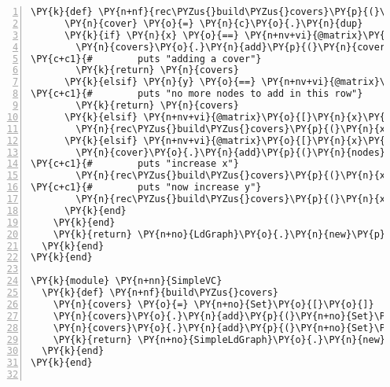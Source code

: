 \begin{Verbatim}[commandchars=\\\{\},numbers=left,firstnumber=1,stepnumber=1,xleftmargin=7mm, fontsize=\small]
    \PY{k}{def} \PY{n+nf}{rec\PYZus{}build\PYZus{}covers}\PY{p}{(}\PY{n}{x}\PY{p}{,}\PY{n}{y}\PY{p}{,}\PY{n}{c}\PY{p}{,}\PY{n}{covers}\PY{p}{,} \PY{n}{nodes}\PY{p}{)} 
      \PY{n}{cover} \PY{o}{=} \PY{n}{c}\PY{o}{.}\PY{n}{dup}
      \PY{k}{if} \PY{n}{x} \PY{o}{==} \PY{n+nv+vi}{@matrix}\PY{o}{.}\PY{n}{length}
        \PY{n}{covers}\PY{o}{.}\PY{n}{add}\PY{p}{(}\PY{n}{cover}\PY{p}{)}
\PY{c+c1}{#        puts "adding a cover"}
        \PY{k}{return} \PY{n}{covers}
      \PY{k}{elsif} \PY{n}{y} \PY{o}{==} \PY{n+nv+vi}{@matrix}\PY{o}{[}\PY{n}{x}\PY{o}{]}\PY{o}{.}\PY{n}{length}
\PY{c+c1}{#        puts "no more nodes to add in this row"}
        \PY{k}{return} \PY{n}{covers}
      \PY{k}{elsif} \PY{n+nv+vi}{@matrix}\PY{o}{[}\PY{n}{x}\PY{o}{]}\PY{o}{[}\PY{n}{y}\PY{o}{]} \PY{o}{==} \PY{l+m+mi}{0}
        \PY{n}{rec\PYZus{}build\PYZus{}covers}\PY{p}{(}\PY{n}{x}\PY{p}{,} \PY{n}{y}\PY{o}{+}\PY{l+m+mi}{1}\PY{p}{,} \PY{n}{cover}\PY{p}{,} \PY{n}{covers}\PY{p}{,} \PY{n}{nodes}\PY{p}{)}
      \PY{k}{elsif} \PY{n+nv+vi}{@matrix}\PY{o}{[}\PY{n}{x}\PY{o}{]}\PY{o}{[}\PY{n}{y}\PY{o}{]} \PY{o}{==} \PY{l+m+mi}{1}
        \PY{n}{cover}\PY{o}{.}\PY{n}{add}\PY{p}{(}\PY{n}{nodes}\PY{o}{[}\PY{n}{y}\PY{o}{]}\PY{o}{.}\PY{n}{id}\PY{p}{)}
\PY{c+c1}{#        puts "increase x"}
        \PY{n}{rec\PYZus{}build\PYZus{}covers}\PY{p}{(}\PY{n}{x}\PY{o}{+}\PY{l+m+mi}{1}\PY{p}{,} \PY{l+m+mi}{0}\PY{p}{,} \PY{n}{cover}\PY{p}{,} \PY{n}{covers}\PY{p}{,} \PY{n}{nodes}\PY{p}{)}
\PY{c+c1}{#        puts "now increase y"}
        \PY{n}{rec\PYZus{}build\PYZus{}covers}\PY{p}{(}\PY{n}{x}\PY{p}{,} \PY{n}{y}\PY{o}{+}\PY{l+m+mi}{1}\PY{p}{,} \PY{n}{c}\PY{p}{,} \PY{n}{covers}\PY{p}{,} \PY{n}{nodes}\PY{p}{)}
      \PY{k}{end}
    \PY{k}{end}
    \PY{k}{return} \PY{n+no}{LdGraph}\PY{o}{.}\PY{n}{new}\PY{p}{(}\PY{n}{rec\PYZus{}build\PYZus{}covers}\PY{p}{(}\PY{l+m+mi}{0}\PY{p}{,}\PY{l+m+mi}{0}\PY{p}{,} \PY{n+no}{Set}\PY{o}{[}\PY{o}{]}\PY{p}{,} \PY{n+no}{Set}\PY{o}{[}\PY{o}{]}\PY{p}{,} \PY{n}{nodes}\PY{p}{)}\PY{p}{,} \PY{n}{nodes}\PY{p}{)}
  \PY{k}{end}  
\PY{k}{end}

\PY{k}{module} \PY{n+nn}{SimpleVC}
  \PY{k}{def} \PY{n+nf}{build\PYZus{}covers}
    \PY{n}{covers} \PY{o}{=} \PY{n+no}{Set}\PY{o}{[}\PY{o}{]}
    \PY{n}{covers}\PY{o}{.}\PY{n}{add}\PY{p}{(}\PY{n+no}{Set}\PY{o}{[}\PY{n+nv+vi}{@id}\PY{o}{]}\PY{p}{)}
    \PY{n}{covers}\PY{o}{.}\PY{n}{add}\PY{p}{(}\PY{n+no}{Set}\PY{o}{.}\PY{n}{new}\PY{p}{(}\PY{n+nv+vi}{@neighbors}\PY{o}{.}\PY{n}{collect}\PY{p}{\PYZob{}}\PY{o}{|}\PY{n}{k}\PY{o}{|} \PY{n}{k}\PY{o}{.}\PY{n}{id}\PY{p}{\PYZcb{}}\PY{p}{)}\PY{p}{)}
    \PY{k}{return} \PY{n+no}{SimpleLdGraph}\PY{o}{.}\PY{n}{new}\PY{p}{(}\PY{n}{covers}\PY{p}{,} \PY{n+nv+vi}{@neighbors} \PY{o}{+} \PY{o}{[}\PY{n+nb}{self}\PY{o}{]}\PY{p}{)}
  \PY{k}{end}
\PY{k}{end}


\end{Verbatim}
